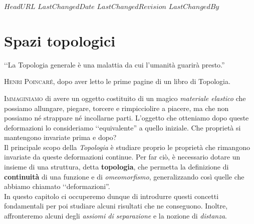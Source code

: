 \svnidlong
{$HeadURL$}
{$LastChangedDate$}
{$LastChangedRevision$}
{$LastChangedBy$}

\chapter{Spazi topologici}

\begin{introduction}
‘‘La Topologia generale è una malattia da cui l'umanità guarirà presto.''
\begin{flushright}
	\textsc{Henri Poincaré,} dopo aver letto le prime pagine di un libro di Topologia.
\end{flushright}
\end{introduction}
\lettrine[findent=1pt, nindent=0pt]{I}{mmaginiamo} di avere un oggetto costituito di un magico \emph{materiale elastico} che possiamo allungare, piegare, torcere e rimpicciolire a piacere, ma che non possiamo né strappare né incollarne parti. L'oggetto che otteniamo dopo queste deformazioni lo consideriamo ‘‘equivalente'' a quello iniziale. Che proprietà si mantengono invariate prima e dopo?\\
Il principale scopo della \textit{Topologia} è studiare proprio le proprietà che rimangono invariate da queste deformazioni continue. Per far ciò, è necessario dotare un insieme di una struttura, detta \textbf{topologia}, che permetta la definizione di \textbf{continuità} di una funzione e di \emph{omeomorfismo}, generalizzando così quelle che abbiamo chiamato ‘‘deformazioni''.\\
In questo capitolo ci occuperemo dunque di introdurre questi concetti fondamentali per poi studiare alcuni risultati che ne conseguono. Inoltre, affronteremo alcuni degli \emph{assiomi di separazione} e la nozione di \emph{distanza}.
